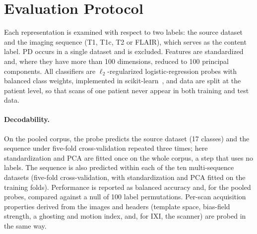 \documentclass[11pt]{article}
\begin{document}
\begin{table}[t]
  \centering
  \small
  \caption{Encoder-specific input size and intensity scaling, applied after
  the shared geometry pipeline.}
  \label{tab:encoder_input}
\end{table}

\section{Evaluation Protocol}
\label{sec:protocol}

Each representation is examined with respect to two labels: the source
dataset and the imaging sequence (T1, T1c, T2 or FLAIR), which serves as the
content label. PD occurs in a single dataset and is excluded. Features are
standardized and, where they have more than 100 dimensions, reduced to 100
principal components. All classifiers are $\ell_2$-regularized
logistic-regression probes with balanced class weights, implemented in
scikit-learn~\cite{pedregosa_scikit-learn_2011}, and data are split at the
patient level, so that scans of one patient never appear in both training
and test data.

\paragraph{Decodability.}
On the pooled corpus, the probe predicts the source dataset (17 classes) and
the sequence under five-fold cross-validation repeated three times; here
standardization and PCA are fitted once on the whole corpus, a step that
uses no labels. The sequence is also predicted within each of the ten
multi-sequence datasets (five-fold cross-validation, with standardization and
PCA fitted on the training folds). Performance is reported as balanced
accuracy and, for the pooled probes, compared against a null of 100 label
permutations. Per-scan acquisition properties derived from the images and
headers (template space, bias-field strength, a ghosting and motion index,
and, for IXI, the scanner) are probed in the same way.
\end{document}
